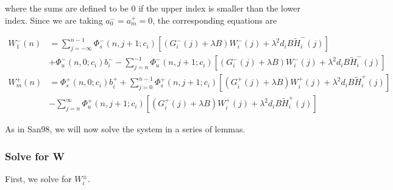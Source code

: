 \documentclass[12pt]{article}
\begin{document}
where the sums are defined to be $0$ if the upper index is smaller than the lower index. Since we are taking $a_0^- = a_m^+ = 0$, the corresponding equations are

\begin{align*}
W_1^-(n) &= \sum_{j = -\infty}^{n-1} \Phi_s^-(n, j+1; c_i)
[(G_i^-(j) + \lambda B) W_i^-(j) + \lambda^2 d_i B \tilde{H}_i^-(j)]
 \\
&+ \Phi_u^-(n, 0; c_i) b_i^- - \sum_{j = n}^{-1} \Phi_u^-(n, j+1; c_i) 
[(G_i^-(j) + \lambda B) W_i^-(j) + \lambda^2 d_i B \tilde{H}_i^-(j)] \\
W_m^+(n) &= \Phi_s^+(n, 0; c_i) b_i^+ + \sum_{j = 0}^{n-1} \Phi_s^+(n, j+1; c_i) 
[(G_i^+(j) + \lambda B) W_i^+(j) + \lambda^2 d_i B \tilde{H}_i^+(j)] \\
&- \sum_{j = n}^{\infty} \Phi_u^+(n, j+1; c_i) 
[(G_i^+(j) + \lambda B) W_i^+(j) + \lambda^2 d_i B \tilde{H}_i^+(j)]
\end{align*}

As in San98, we will now solve the system in a series of lemmas.

\subsubsection{Solve for W}

First, we solve for $W_i^\pm$. 
\end{document}
